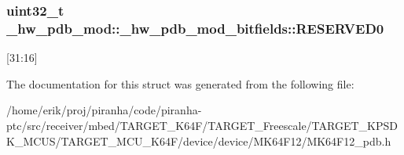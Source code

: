 \subsubsection[{\texorpdfstring{R\+E\+S\+E\+R\+V\+E\+D0}{RESERVED0}}]{\setlength{\rightskip}{0pt plus 5cm}uint32\+\_\+t \+\_\+hw\+\_\+pdb\+\_\+mod\+::\+\_\+hw\+\_\+pdb\+\_\+mod\+\_\+bitfields\+::\+R\+E\+S\+E\+R\+V\+E\+D0}\hypertarget{struct__hw__pdb__mod_1_1__hw__pdb__mod__bitfields_a567ff017f05588930ed36bedd8aa5e1f}{}\label{struct__hw__pdb__mod_1_1__hw__pdb__mod__bitfields_a567ff017f05588930ed36bedd8aa5e1f}
\mbox{[}31\+:16\mbox{]} 

The documentation for this struct was generated from the following file\+:\begin{DoxyCompactItemize}
\item 
/home/erik/proj/piranha/code/piranha-\/ptc/src/receiver/mbed/\+T\+A\+R\+G\+E\+T\+\_\+\+K64\+F/\+T\+A\+R\+G\+E\+T\+\_\+\+Freescale/\+T\+A\+R\+G\+E\+T\+\_\+\+K\+P\+S\+D\+K\+\_\+\+M\+C\+U\+S/\+T\+A\+R\+G\+E\+T\+\_\+\+M\+C\+U\+\_\+\+K64\+F/device/device/\+M\+K64\+F12/M\+K64\+F12\+\_\+pdb.\+h\end{DoxyCompactItemize}
